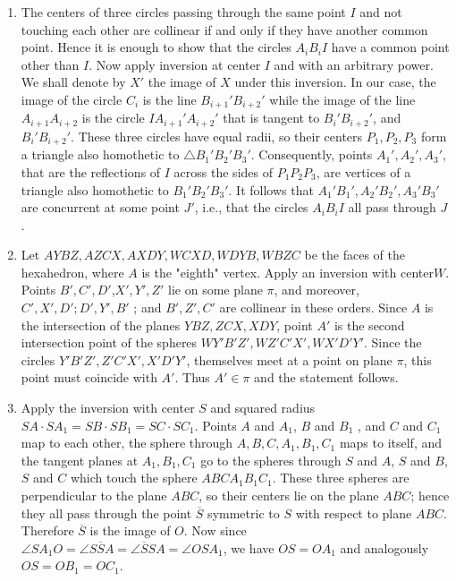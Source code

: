 \documentclass[11pt,a4paper]{article}
\begin{document}
\begin{enumerate}
\item The centers of three circles passing through the same point $I$ and not touching each other are collinear if and only if they have another common point. Hence it is enough to show that the circles $A_iB_iI$ have a common point other than $I$. Now apply inversion at center $I$ and with an arbitrary power. We shall denote by $X'$ the image of $X$ under this inversion. In our case, the image of the circle $C_i$ is the line $B_{i+1}'B_{i+2}'$ while the image of the line $A_{i+1}A_{i+2}$  is the circle $IA_{i+1}\prime A_{i+2}\prime$ that is tangent to $B_i\prime B_{i+2}\prime$, and $B_i\prime B_{i+2}\prime$. These three circles have equal radii, so their centers $P_1,P_2,P_3$ form a triangle also homothetic to $\triangle B_1\prime B_2\prime B_3\prime$. Consequently, points $A_1\prime ,A_2\prime ,A_3\prime$, that are the reflections of $I$ across the sides of $P_1P_2P_3$, are vertices of a triangle also homothetic to $B_1\prime B_2\prime B_3\prime$. It follows that $A_1\prime B_1\prime ,A_2\prime B_2\prime ,A_3\prime B_3\prime$ are concurrent at some point $J'$, i.e., that the circles $A_iB_iI$ all pass through $J$. 

\item Let $AYBZ,AZCX,AXDY,WCXD,WDYB,WBZC$  be the faces of the hexahedron, where $A$ is the "eighth" vertex. Apply an inversion with center$W$. Points $B\prime ,C\prime ,D\prime$,$X\prime ,Y\prime ,Z\prime$   lie on some plane $\pi$, and moreover, $C\prime ,X\prime ,D\prime; D\prime ,Y\prime ,B\prime$ ; and $B',Z',C'$ are collinear in these orders. Since $A$ is the intersection of the planes $YBZ,ZCX,XDY$, point $A'$ is the second intersection point of the spheres $WY\prime B\prime Z\prime ,WZ\prime C\prime X\prime ,WX\prime D\prime Y\prime$. Since the circles $Y\prime B\prime Z\prime ,Z\prime C\prime X\prime ,X\prime D\prime Y\prime$,   themselves meet at a point on plane $\pi$, this point must coincide with $A'$. Thus $A'\in\pi$ and the statement follows. 

\item Apply the inversion with center $S$ and squared radius $SA
\cdot SA_1=SB\cdot SB_1=SC\cdot SC_1$. Points $A$ and $A_1$, $B$  and  $B_1$  , and $C$  and $C_1$ map to each other, the sphere through $A,B,C,A_1,B_1,C_1$ maps to itself, and the tangent planes at $A_1,B_1,C_1$  go to the spheres through $S$ and $A$, $S$ and $B$, $S$ and $C$ which touch the sphere $ABCA_1B_1C_1$. These three spheres are perpendicular to the plane $ABC$, so their centers lie on the plane $ABC$; hence they all pass through the point $\overline{S}$  symmetric to $S$ with respect to plane $ABC$. Therefore $\overline{S}$ is the image of $O$. Now since $\angle
SA_1O=\angle S\overline{S}A=\angle\overline{S}SA=\angle OSA_1$, we have $OS=OA_1$ and analogously $OS=OB_1=OC_1$.


\end{enumerate}
\end{document}
